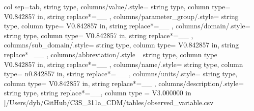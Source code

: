 \begin{landscape}
    col sep=tab,
    string type,
    columns/value/.style={
            string type, 
            column type= V{0.842857 in}, 
            string replace*={_}{\_}
        },
    columns/parameter_group/.style={
            string type, 
            column type= V{0.842857 in}, 
            string replace*={_}{\_}
        },
    columns/domain/.style={
            string type, 
            column type= V{0.842857 in}, 
            string replace*={_}{\_}
        },
    columns/sub_domain/.style={
            string type, 
            column type= V{0.842857 in}, 
            string replace*={_}{\_}
        },
    columns/abbreviation/.style={
            string type, 
            column type= V{0.842857 in}, 
            string replace*={_}{\_}
        },
    columns/name/.style={
            string type, 
            column type= n{0.842857 in}, 
            string replace*={_}{\_}
        },
    columns/units/.style={
            string type, 
            column type= V{0.842857 in}, 
            string replace*={_}{\_}
        },
    columns/description/.style={
            string type, 
            string replace*={_}{\_},
            column type = V{3.000000 in}
        }
    ]{/Users/dyb/GitHub/C3S_311a_CDM/tables/observed_variable.csv}
\end{landscape}

